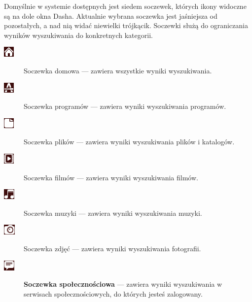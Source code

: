 Domyślnie w systemie dostępnych jest siedem soczewek, których ikony widoczne są na dole okna Dasha. Aktualnie wybrana soczewka jest jaśniejsza od pozostałych, a nad nią widać niewielki trójkącik. Soczewki służą do ograniczania wyników wyszukiwania do konkretnych kategorii.
\begin{description}
\item[\includegraphics{images/unity_dash_lens_home.png}] \textcolor{ubuntu_orange}{Soczewka domowa} --- zawiera wszystkie wyniki wyszukiwania. 
\item[\includegraphics{images/unity_dash_lens_programy.png}]\textcolor{ubuntu_orange}{Soczewka programów} --- zawiera wyniki wyszukiwania programów.
\item[\includegraphics{images/unity_dash_lens_pliki.png}] \textcolor{ubuntu_orange}{Soczewka plików} --- zawiera wyniki wyszukiwania plików i katalogów.
\item[\includegraphics{images/unity_dash_lens_video.png}] \textcolor{ubuntu_orange}{Soczewka filmów} --- zawiera wyniki wyszukiwania filmów.
\item[\includegraphics{images/unity_dash_lens_audio.png}] \textcolor{ubuntu_orange}{Soczewka muzyki} --- zawiera wyniki wyszukiwania muzyki.
\item[\includegraphics{images/unity_dash_lens_photo.png}] \textcolor{ubuntu_orange}{Soczewka zdjęć} --- zawiera wyniki wyszukiwania fotografii.
\item[\includegraphics{images/unity_dash_lens_social.png}] \textbf{Soczewka społecznościowa} --- zawiera wyniki wyszukiwania w serwisach społecznościowych, do których jesteś zalogowany.
\end{description}

